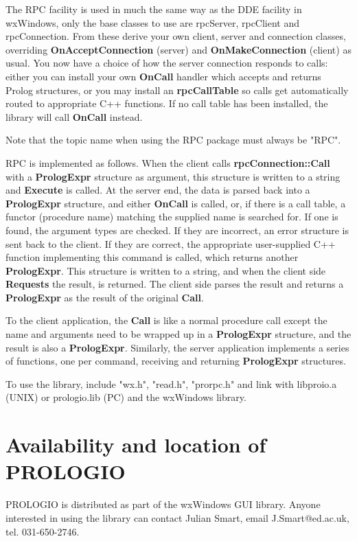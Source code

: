 The RPC facility is used in much the same way as the DDE facility in
wxWindows, only the base classes to use are rpcServer, rpcClient and
rpcConnection.  From these derive your own client, server and connection classes,
overriding {\bf OnAcceptConnection} (server) and {\bf OnMakeConnection}
(client) as usual. You now have a choice of how the server connection
responds to calls: either you can install your own {\bf OnCall} handler
which accepts and returns Prolog structures, or you may install an {\bf
rpcCallTable} so calls get automatically routed to appropriate C++
functions.  If no call table has been installed, the library will call
{\bf OnCall} instead.

Note that the topic name when using the RPC package must always be
"RPC".

RPC is implemented as follows. When the client calls {\bf
rpcConnection::Call} with a {\bf PrologExpr} structure as argument, this
structure is written to a string and {\bf Execute} is called. At the
server end, the data is parsed back into a {\bf PrologExpr} structure,
and either {\bf OnCall} is called, or, if there is a call table, a
functor (procedure name) matching the supplied name is searched for. If
one is found, the argument types are checked. If they are incorrect, an
error structure is sent back to the client. If they are correct, the
appropriate user-supplied C++ function implementing this command is
called, which returns another {\bf PrologExpr}. This structure is
written to a string, and when the client side {\bf Requests} the result, is
returned. The client side parses the result and returns a {\bf
PrologExpr} as the result of the original {\bf Call}.

To the client application, the {\bf Call} is like a normal procedure
call except the name and arguments need to be wrapped up in a {\bf
PrologExpr} structure, and the result is also a {\bf PrologExpr}.
Similarly, the server application implements a series of functions, one
per command, receiving and returning {\bf PrologExpr} structures.

To use the library, include "wx.h", "read.h", "prorpc.h" and link with
libproio.a (UNIX) or prologio.lib (PC) and the wxWindows library.

\section{Availability and location of PROLOGIO}

PROLOGIO is distributed as part of the wxWindows GUI library. Anyone
interested in using the library can contact Julian Smart, email
J.Smart@ed.ac.uk, tel. 031-650-2746.

